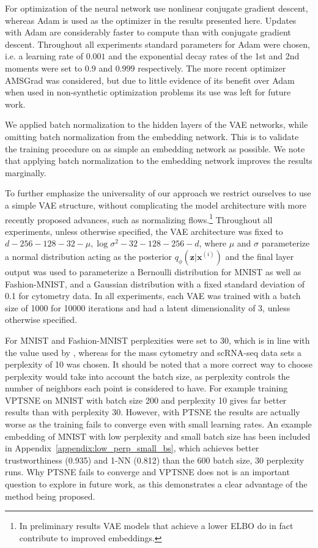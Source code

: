 For optimization of the neural network \cite{parametric_tsne} use nonlinear conjugate gradient descent, whereas Adam \citep{adam} is used as the optimizer in the results presented here. Updates with Adam are considerably faster to compute than with conjugate gradient descent. Throughout all experiments standard parameters for Adam were chosen, i.e. a learning rate of $0.001$ and the exponential decay rates of the 1st and 2nd moments were set to $0.9$ and $0.999$ respectively. The more recent optimizer AMSGrad \cite{on_the_convergence_of_adam} was considered, but due to little evidence of its benefit over Adam when used in non-synthetic optimization problems its use was left for future work.

We applied batch normalization \cite{batch_normalization} to the hidden layers of the VAE networks, while omitting batch normalization from the embedding network. This is to validate the training procedure on as simple an embedding network as possible. We note that applying batch normalization to the embedding network improves the results marginally.

To further emphasize the universality of our approach we restrict ourselves to use a simple VAE structure, without complicating the model architecture with more recently proposed advances, such as normalizing flows.\footnote{In preliminary results VAE models that achieve a lower ELBO do in fact contribute to improved embeddings.} Throughout all experiments, unless otherwise specified, the VAE architecture was fixed to $d - 256 - 128 - 32 - \mu, \log \sigma^2 - 32 - 128 - 256 - d$, where $\mu$ and $\sigma$ parameterize a normal distribution acting as the posterior $q_{\phi}(\mathbf{z} \vert \mathbf{x}^{(i)})$ and the final layer output was used to parameterize a Bernoulli distribution for MNIST as well as Fashion-MNIST, and a Gaussian distribution with a fixed standard deviation of 0.1 for cytometry data. In all experiments, each VAE was trained with a batch size of 1000 for 10000 iterations and had a latent dimensionality of $3$, unless otherwise specified.

For MNIST and Fashion-MNIST perplexities were set to 30, which is in line with the value used by \cite{parametric_tsne}, whereas for the mass cytometry and scRNA-seq data sets a perplexity of 10 was chosen. It should be noted that a more correct way to choose perplexity would take into account the batch size, as perplexity controls the number of neighbors each point is considered to have. For example training VPTSNE on MNIST with batch size 200 and perplexity 10 gives far better results than with perplexity 30. However, with PTSNE the results are actually worse as the training fails to converge even with small learning rates. An example embedding of MNIST with low perplexity and small batch size has been included in Appendix~\ref{appendix:low_perp_small_bs}, which achieves better trustworthiness (0.935) and 1-NN (0.812) than the 600 batch size, 30 perplexity runs. Why PTSNE fails to converge and VPTSNE does not is an important question to explore in future work, as this demonstrates a clear advantage of the method being proposed.

